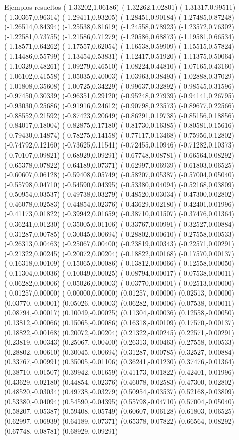 \documentclass[11pt,a4paper]{article}
\begin{document}
\begin{fmex}{Ejemplos resueltos}
(-1.33202,1.06186) (-1.32262,1.02801) (-1.31317,0.99511) (-1.30367,0.96314) (-1.29411,0.93205) (-1.28451,0.90184) (-1.27485,0.87248) (-1.26514,0.84394) (-1.25538,0.81619) (-1.24558,0.78923) (-1.23572,0.76302) (-1.22581,0.73755) (-1.21586,0.71279) (-1.20586,0.68873) (-1.19581,0.66534) (-1.18571,0.64262) (-1.17557,0.62054) (-1.16538,0.59909) (-1.15515,0.57824) (-1.14486,0.55799) (-1.13454,0.53831) (-1.12417,0.51920) (-1.11375,0.50064) (-1.10329,0.48261) (-1.09279,0.46510) (-1.08224,0.44810) (-1.07165,0.43160) (-1.06102,0.41558) (-1.05035,0.40003) (-1.03963,0.38493) (-1.02888,0.37029) (-1.01808,0.35608) (-1.00725,0.34229) (-0.99637,0.32892) (-0.98545,0.31596) (-0.97450,0.30339) (-0.96351,0.29120) (-0.95248,0.27939) (-0.94141,0.26795) (-0.93030,0.25686) (-0.91916,0.24612) (-0.90798,0.23573) (-0.89677,0.22566) (-0.88552,0.21592) (-0.87423,0.20649) (-0.86291,0.19738) (-0.85156,0.18856) (-0.84017,0.18004) (-0.82875,0.17180) (-0.81730,0.16385) (-0.80581,0.15616) (-0.79430,0.14874) (-0.78275,0.14158) (-0.77117,0.13468) (-0.75956,0.12802) (-0.74792,0.12160) (-0.73625,0.11541) (-0.72455,0.10946) (-0.71282,0.10373) (-0.70107,0.09821) (-0.68929,0.09291) (-0.67748,0.08781) (-0.66564,0.08292) (-0.65378,0.07822) (-0.64189,0.07371) (-0.62997,0.06939) (-0.61803,0.06525) (-0.60607,0.06128) (-0.59408,0.05749) (-0.58207,0.05387) (-0.57004,0.05040) (-0.55798,0.04710) (-0.54590,0.04395) (-0.53380,0.04094) (-0.52168,0.03809) (-0.50954,0.03537) (-0.49738,0.03279) (-0.48520,0.03034) (-0.47300,0.02802) (-0.46078,0.02583) (-0.44854,0.02376) (-0.43629,0.02180) (-0.42401,0.01996) (-0.41173,0.01822) (-0.39942,0.01659) (-0.38710,0.01507) (-0.37476,0.01364) (-0.36241,0.01230) (-0.35005,0.01106) (-0.33767,0.00991) (-0.32527,0.00884) (-0.31287,0.00785) (-0.30045,0.00694) (-0.28802,0.00610) (-0.27558,0.00533) (-0.26313,0.00463) (-0.25067,0.00400) (-0.23819,0.00343) (-0.22571,0.00291) (-0.21322,0.00245) (-0.20072,0.00204) (-0.18822,0.00168) (-0.17570,0.00137) (-0.16318,0.00109) (-0.15065,0.00086) (-0.13812,0.00066) (-0.12558,0.00050) (-0.11304,0.00036) (-0.10049,0.00025) (-0.08794,0.00017) (-0.07538,0.00011) (-0.06282,0.00006) (-0.05026,0.00003) (-0.03770,0.00001) (-0.02513,0.00000) (-0.01257,0.00000) (-0.00000,0.00000) (0.01257,-0.00000) (0.02513,-0.00000) (0.03770,-0.00001) (0.05026,-0.00003) (0.06282,-0.00006) (0.07538,-0.00011) (0.08794,-0.00017) (0.10049,-0.00025) (0.11304,-0.00036) (0.12558,-0.00050) (0.13812,-0.00066) (0.15065,-0.00086) (0.16318,-0.00109) (0.17570,-0.00137) (0.18822,-0.00168) (0.20072,-0.00204) (0.21322,-0.00245) (0.22571,-0.00291) (0.23819,-0.00343) (0.25067,-0.00400) (0.26313,-0.00463) (0.27558,-0.00533) (0.28802,-0.00610) (0.30045,-0.00694) (0.31287,-0.00785) (0.32527,-0.00884) (0.33767,-0.00991) (0.35005,-0.01106) (0.36241,-0.01230) (0.37476,-0.01364) (0.38710,-0.01507) (0.39942,-0.01659) (0.41173,-0.01822) (0.42401,-0.01996) (0.43629,-0.02180) (0.44854,-0.02376) (0.46078,-0.02583) (0.47300,-0.02802) (0.48520,-0.03034) (0.49738,-0.03279) (0.50954,-0.03537) (0.52168,-0.03809) (0.53380,-0.04094) (0.54590,-0.04395) (0.55798,-0.04710) (0.57004,-0.05040) (0.58207,-0.05387) (0.59408,-0.05749) (0.60607,-0.06128) (0.61803,-0.06525) (0.62997,-0.06939) (0.64189,-0.07371) (0.65378,-0.07822) (0.66564,-0.08292) (0.67748,-0.08781) (0.68929,-0.09291) 
\end{fmex}
\end{document}
